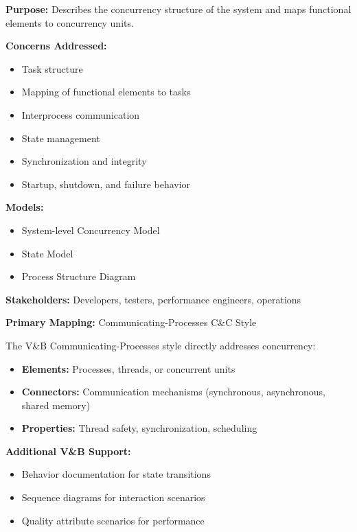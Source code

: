 \documentclass[11pt]{article}
\begin{document}
\begin{rwbox}
\textbf{Purpose:} Describes the concurrency structure of the system and maps functional elements to concurrency units.

\textbf{Concerns Addressed:}
\begin{itemize}[nosep]
    \item Task structure
    \item Mapping of functional elements to tasks
    \item Interprocess communication
    \item State management
    \item Synchronization and integrity
    \item Startup, shutdown, and failure behavior
\end{itemize}

\textbf{Models:}
\begin{itemize}[nosep]
    \item System-level Concurrency Model
    \item State Model
    \item Process Structure Diagram
\end{itemize}

\textbf{Stakeholders:} Developers, testers, performance engineers, operations
\end{rwbox}

\begin{vbbox}
\textbf{Primary Mapping:} Communicating-Processes C\&C Style

The V\&B Communicating-Processes style directly addresses concurrency:

\begin{itemize}
    \item \textbf{Elements:} Processes, threads, or concurrent units
    \item \textbf{Connectors:} Communication mechanisms (synchronous, asynchronous, shared memory)
    \item \textbf{Properties:} Thread safety, synchronization, scheduling
\end{itemize}

\textbf{Additional V\&B Support:}
\begin{itemize}
    \item Behavior documentation for state transitions
    \item Sequence diagrams for interaction scenarios
    \item Quality attribute scenarios for performance
\end{itemize}
\end{vbbox}
\end{document}
